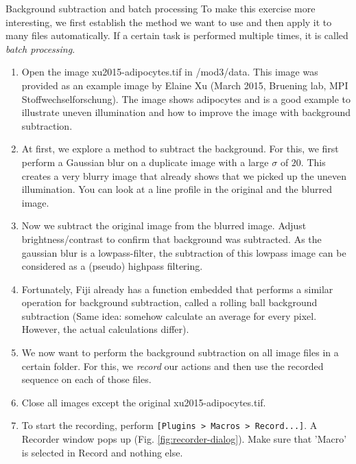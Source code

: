 \begin{taskbox}{Background subtraction and batch processing}
To make this exercise more interesting, we first establish the method we want to use and then apply it to many files automatically. If a certain task is performed multiple times, it is called \emph{batch processing}. 

\begin{enumerate}
	\item Open the image xu2015-adipocytes.tif in /mod3/data. This image was provided as an example image by Elaine Xu (March 2015, Bruening lab, MPI Stoffwechselforschung). The image shows adipocytes and is a good example to illustrate uneven illumination and how to improve the image with background subtraction.
	\item At first, we explore a method to subtract the background. For this, we first perform a Gaussian blur on a duplicate image with a large $\sigma$ of $20$. This creates a very blurry image that already shows that we picked up the uneven illumination. You can look at a line profile in the original and the blurred image.
	\item Now we subtract the original image from the blurred image. Adjust brightness/contrast to confirm that background was subtracted. As the gaussian blur is a lowpass-filter, the subtraction of this lowpass image can be considered as a (pseudo) highpass filtering.
	\item Fortunately, Fiji already has a function embedded that performs a similar operation for background subtraction, called a rolling ball background subtraction (Same idea: somehow calculate an average for every pixel. However, the actual calculations differ). 
	\item We now want to perform the background subtraction on all image files in a certain folder. For this, we \emph{record} our actions and then use the recorded sequence on each of those files.
	\item Close all images except the original xu2015-adipocytes.tif.
	\item To start the recording, perform \texttt{[Plugins > Macros > Record...]}. A Recorder window pops up (Fig. \ref{fig:recorder-dialog}). Make sure that 'Macro' is selected in Record and nothing else.
	

\end{enumerate}
\end{taskbox}
